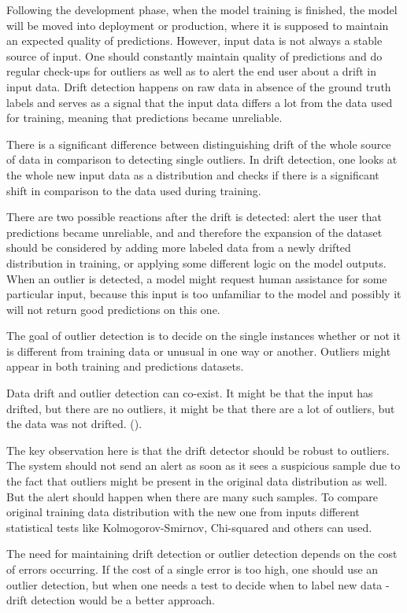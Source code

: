 Following the development phase, when the model training is finished, the model will be moved into deployment or production, where it is supposed to maintain an expected quality of predictions. However, input data is not always a stable source of input. One should constantly maintain quality of predictions and do regular check-ups for outliers as well as to alert the end user about a drift in input data. Drift detection happens on raw data in absence of the ground truth labels and serves as a signal that the input data differs a lot from the data used for training, meaning that predictions became unreliable.

There is a significant difference between distinguishing drift of the whole source of data in comparison to detecting single outliers. In drift detection, one looks at the whole new input data as a distribution and checks if there is a significant shift in comparison to the data used during training.

There are two possible reactions after the drift is detected: alert the user that predictions became unreliable, and and therefore the expansion of the dataset should be considered by adding more labeled data from a newly drifted distribution in training, or applying some different logic on the model outputs. When an outlier is detected, a model might request human assistance for some particular input, because this input is too unfamiliar to the model and possibly it will not return good predictions on this one.

The goal of outlier detection is to decide on the single instances whether or not it is different from training data or unusual in one way or another. Outliers might appear in both training and predictions datasets.

Data drift and outlier detection can co-exist. It might be that the input has drifted, but there are no outliers, it might be that there are a lot of outliers, but the data was not drifted. (\cite{samuylova_2021}).

The key observation here is that the drift detector should be robust to outliers. The system should not send an alert as soon as it sees a suspicious sample due to the fact that outliers might be present in the original data distribution as well. But the alert should happen when there are many such samples. To compare original training data distribution with the new one from inputs different statistical tests like Kolmogorov-Smirnov, Chi-squared and others can used.

The need for maintaining drift detection or outlier detection depends on the cost of errors occurring. If the cost of a single error is too high, one should use an outlier detection, but when one needs a test to decide when to label new data - drift detection would be a better approach.

